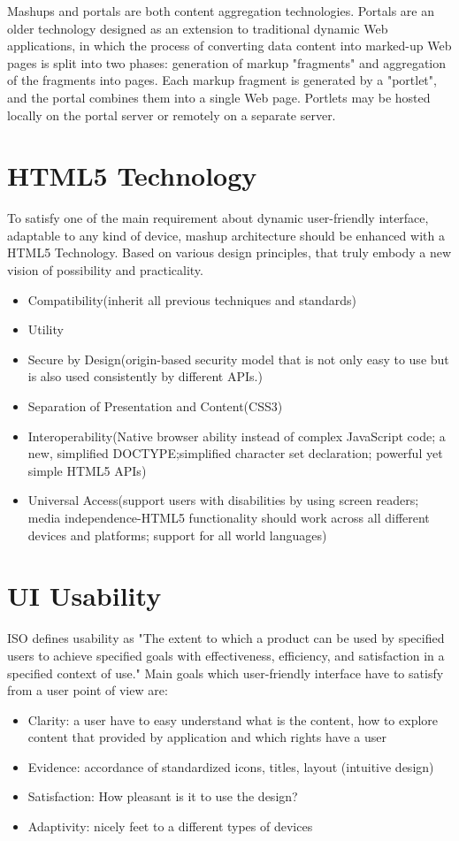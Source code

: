 \newline
Mashups and portals are both content aggregation technologies. Portals are an older technology designed as an extension to traditional dynamic Web applications, in which the process of converting data content into marked-up Web pages is split into two phases: generation of markup "fragments" and aggregation of the fragments into pages. Each markup fragment is generated by a "portlet", and the portal combines them into a single Web page. Portlets may be hosted locally on the portal server or remotely on a separate server.
\newline
\section{HTML5 Technology}
To satisfy one of the main requirement about dynamic user-friendly interface, adaptable to any kind of device, mashup architecture should be enhanced with a HTML5 Technology. Based on various design principles, that truly embody a new vision of possibility and practicality\cite{hickson2011html5}.
\begin{itemize}
\item Compatibility(inherit all previous techniques and standards)
\item Utility
\item Secure by Design(origin-based security model that is not only easy to use but is also used consistently by different APIs.)
\item Separation of Presentation and Content(CSS3)
\item Interoperability(Native browser ability instead of complex JavaScript code; a new, simplified DOCTYPE;simplified character set declaration; powerful yet simple HTML5 APIs)
\item Universal Access(support users with disabilities by using screen readers; media independence-HTML5 functionality should work across all different devices and platforms; support for all world languages)
\end{itemize}

\section {UI Usability}
ISO defines usability as "The extent to which a product can be used by specified users to achieve specified goals with effectiveness, efficiency, and satisfaction in a specified context of use."
Main goals which user-friendly interface have to satisfy from a user point of view are\cite{baxter2012human,jakob,visdesign}:
\begin{itemize}
\item Clarity: a user have to easy understand what is the content, how to explore content that provided by application and which rights have a user
\item Evidence: accordance of standardized icons, titles, layout (intuitive design)
\item Satisfaction: How pleasant is it to use the design?
\item Adaptivity: nicely feet to a different types of devices
\end{itemize}

